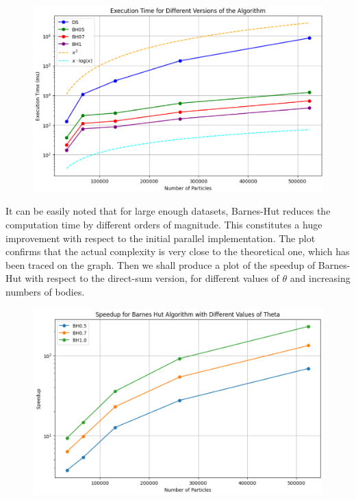 \documentclass{article}
\begin{document}
\begin{figure} [h]
    \centering
    \includegraphics[width=1\textwidth]
    {images/BH_DS_comparison.png}
    \label{fig:execution_time}
\end{figure}

\noindent It can be easily noted that for large enough datasets, Barnes-Hut reduces the computation time by different orders of magnitude. This constitutes a huge improvement with respect to the initial parallel implementation. The plot confirms that the actual complexity is very close to the theoretical one, which has been traced on the graph.
\noindent Then we shall produce a plot of the speedup of Barnes-Hut with respect to the direct-sum version, for different values of $\theta$ and increasing numbers of bodies.

\begin{figure} [h]
    \centering
    \includegraphics[width=1\textwidth]
    {images/BH_speedup.png}
    \label{fig:BH_speedup}
\end{figure}
\end{document}
